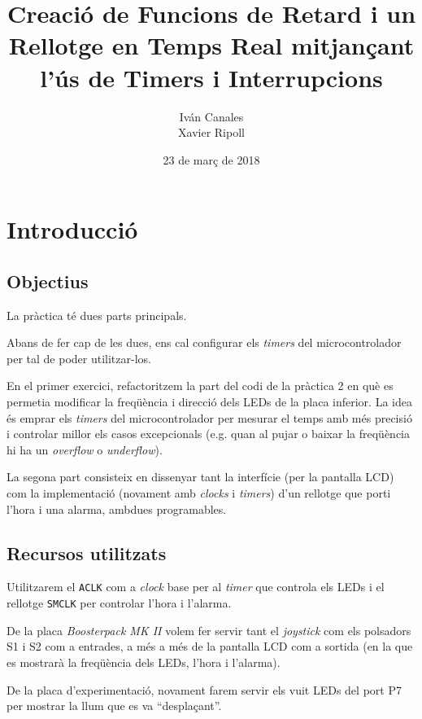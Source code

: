 \documentclass{../pdae} %
\title{Creació de Funcions de Retard i un Rellotge en Temps Real mitjançant
l’ús de Timers i Interrupcions}
\author{
    Iván Canales\\
    Xavier Ripoll
}
\date{23 de març de 2018} %
\begin{document}
\maketitle

\section{Introducció}

\subsection{Objectius}

La pràctica té dues parts principals.

Abans de fer cap de les dues, ens cal configurar els \textit{timers} del
microcontrolador per tal de poder utilitzar-los.

En el primer exercici, refactoritzem la part del
codi de la pràctica 2 en què es permetia modificar la freqüència i direcció
dels LEDs de la placa inferior. La idea és emprar els \textit{timers} del
microcontrolador per mesurar el temps amb més precisió i controlar millor
els casos excepcionals (e.g. quan al pujar o baixar la freqüència hi ha un
\textit{overflow} o \textit{underflow}).

La segona part consisteix en dissenyar tant la interfície (per la pantalla LCD)
com la implementació (novament amb \textit{clocks} i \textit{timers}) d'un
rellotge que porti l'hora i una alarma, ambdues programables.


\subsection{Recursos utilitzats}
Utilitzarem el \texttt{ACLK} com a \textit{clock} base per al \textit{timer}
que controla els LEDs i el rellotge \texttt{SMCLK} per controlar l'hora i
l'alarma.

De la placa \textit{Boosterpack MK II} volem fer servir tant el
\textit{joystick} com els polsadors S1 i S2 com a entrades, a més a més de la
pantalla LCD com a sortida (en la que es mostrarà la freqüència dels LEDs,
l'hora i l'alarma).

De la placa d'experimentació, novament farem servir els vuit LEDs del port P7
per mostrar la llum que es va ``desplaçant''.
\end{document}
